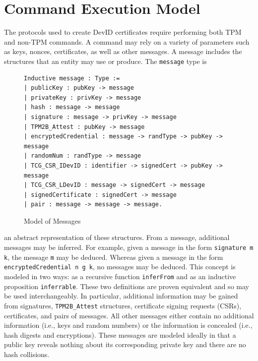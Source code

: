 \documentclass[runningheads]{llncs}
\begin{document}
\section{Command Execution Model}
The protocols used to create DevID certificates require performing both TPM and non-TPM commands. A command may rely on a variety of parameters such as keys, nonces, certificates, as well as other messages. A message includes the structures that an entity may use or produce. The \verb|message| type is 
\begin{figure}[h]
\begin{lstlisting}[language=Coq]
Inductive message : Type :=
| publicKey : pubKey -> message
| privateKey : privKey -> message
| hash : message -> message
| signature : message -> privKey -> message
| TPM2B_Attest : pubKey -> message
| encryptedCredential : message -> randType -> pubKey -> message
| randomNum : randType -> message
| TCG_CSR_IDevID : identifier -> signedCert -> pubKey -> message
| TCG_CSR_LDevID : message -> signedCert -> message
| signedCertificate : signedCert -> message
| pair : message -> message -> message.
\end{lstlisting}
\caption{Model of Messages}
\end{figure}
an abstract representation of these structures. From a message, additional messages may be inferred. For example, given a message in the form \verb|signature m k|, the message \verb|m| may be deduced. Whereas given a message in the form \verb|encryptedCredential n g k|, no messages may be deduced. This concept is modeled in two ways: as a recursive function \verb|inferFrom| and as an inductive proposition \verb|inferrable|. These two definitions are proven equivalent and so may be used interchangeably. In particular, additional information may be gained from signatures, \verb|TPM2B_Attest| structures, certificate signing requests (CSRs), certificates, and pairs of messages. All other messages either contain no additional information (i.e., keys and random numbers) or the information is concealed (i.e., hash digests and encryptions). These messages are modeled ideally in that a public key reveals nothing about its corresponding private key and there are no hash collisions.
\end{document}
